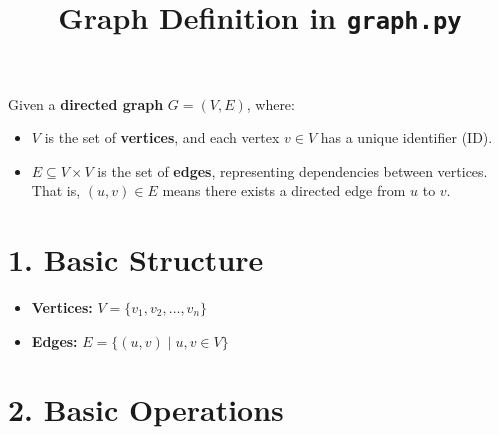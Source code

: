 \documentclass{article}
\title{Graph Definition in \texttt{graph.py}}
\author{}
\date{}
\begin{document}
\maketitle

Given a \textbf{directed graph} $G = (V, E)$, where:

\begin{itemize}
    \item $V$ is the set of \textbf{vertices}, and each vertex $v \in V$ has a unique identifier (ID).
    \item $E \subseteq V \times V$ is the set of \textbf{edges}, representing dependencies between vertices. That is, $(u, v) \in E$ means there exists a directed edge from $u$ to $v$.
\end{itemize}

\section*{1. Basic Structure}

\begin{itemize}
    \item \textbf{Vertices:} $V = \{v_1, v_2, \dots, v_n\}$
    \item \textbf{Edges:} $E = \{(u, v) \mid u, v \in V\}$
\end{itemize}

\section*{2. Basic Operations}
\end{document}
